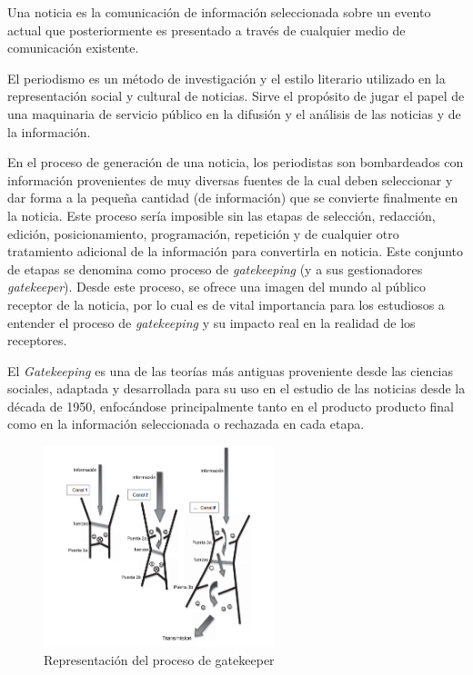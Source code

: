 \label{sec:definicion_problema}

Una noticia es la comunicación de información seleccionada sobre un evento actual que posteriormente es presentado a través de cualquier medio de comunicación existente.\cite{Shirky_2008_Herecomes}

El periodismo es un método de investigación y el estilo literario utilizado en la representación social y cultural de noticias. Sirve el propósito de jugar el papel de una maquinaria de servicio público en la difusión y el análisis de las noticias y de la información. \cite{harcup2004journalism} 

En el proceso de generación de una noticia, los periodistas son bombardeados con información provenientes de muy diversas fuentes de la cual deben seleccionar y dar forma a la pequeña cantidad (de información) que se convierte finalmente en la noticia. Este proceso sería imposible sin las etapas de selección, redacción, edición, posicionamiento, programación, repetición y de cualquier otro tratamiento adicional de la información para convertirla en noticia. 
Este conjunto de etapas se denomina como proceso de \emph{gatekeeping} (y a sus gestionadores \emph{gatekeeper}). Desde este proceso, se ofrece una imagen del mundo al público receptor de la noticia, por lo cual es de vital importancia para los estudiosos a entender el proceso de \emph{gatekeeping} y su impacto real en la realidad de los receptores.

El \emph{Gatekeeping} es una de las teorías más antiguas proveniente desde las ciencias sociales, adaptada y desarrollada para su uso en el estudio de las noticias desde la década de 1950, enfocándose principalmente tanto en el producto producto final como en la información seleccionada o rechazada en cada etapa.

\begin{figure}[h]
  \centering
    \includegraphics[width=0.6\textwidth]{imgs/gatekeeper.png}
  \caption{Representación del proceso de gatekeeper \cite{wahl2008handbook}}
  \label{fig:gatekeeper}
\end{figure}

